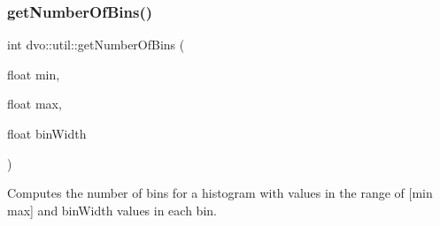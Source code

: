 \mbox{\label{namespacedvo_1_1util_a3523b38b32b8f623b5aeff6e7c4339cb}} 
\subsubsection{\texorpdfstring{get\+Number\+Of\+Bins()}{getNumberOfBins()}}
{\footnotesize\ttfamily int dvo\+::util\+::get\+Number\+Of\+Bins (\begin{DoxyParamCaption}\item[{float}]{min,  }\item[{float}]{max,  }\item[{float}]{bin\+Width }\end{DoxyParamCaption})}

Computes the number of bins for a histogram with values in the range of \mbox{[}min max\mbox{]} and bin\+Width values in each bin. 